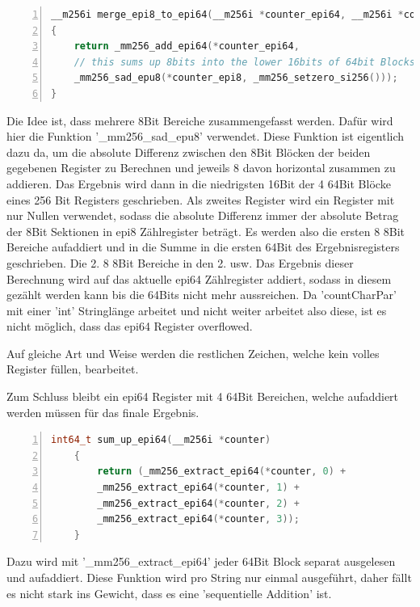\documentclass[plainarticle,zihtitle,german,final,hyperref,utf8]{zihpub}
\begin{document}
\begin{lstlisting}[language=c, numbers=left]
__m256i merge_epi8_to_epi64(__m256i *counter_epi64, __m256i *counter_epi8)
{
	return _mm256_add_epi64(*counter_epi64, 
	// this sums up 8bits into the lower 16bits of 64bit Blocks
	_mm256_sad_epu8(*counter_epi8, _mm256_setzero_si256()));
}
\end{lstlisting}

Die Idee ist, dass mehrere 8Bit Bereiche zusammengefasst werden. Dafür wird hier die Funktion '\_mm256\_sad\_epu8' verwendet. Diese Funktion ist eigentlich dazu da, um die absolute Differenz zwischen den 8Bit Blöcken der beiden gegebenen Register zu Berechnen und jeweils 8 davon horizontal zusammen zu addieren. Das Ergebnis wird dann in die niedrigsten 16Bit der 4 64Bit Blöcke eines 256 Bit Registers geschrieben. Als zweites Register wird ein Register mit nur Nullen verwendet, sodass die absolute Differenz immer der absolute Betrag der 8Bit Sektionen in epi8 Zählregister beträgt.
Es werden also die ersten 8 8Bit Bereiche aufaddiert und in die Summe in die ersten 64Bit des Ergebnisregisters geschrieben. Die 2. 8 8Bit Bereiche in den 2. usw.
Das Ergebnis dieser Berechnung wird auf das aktuelle epi64 Zählregister addiert, sodass in diesem gezählt werden kann bis die 64Bits nicht mehr aussreichen. Da 'countCharPar' mit einer 'int' Stringlänge arbeitet und nicht weiter arbeitet also diese, ist es nicht möglich, dass das epi64 Register overflowed.

Auf gleiche Art und Weise werden die restlichen Zeichen, welche kein volles Register füllen, bearbeitet.

Zum Schluss bleibt ein epi64 Register mit 4 64Bit Bereichen, welche aufaddiert werden müssen für das finale Ergebnis.
\begin{lstlisting}[language=c, numbers=left]
	int64_t sum_up_epi64(__m256i *counter)
	{
		return (_mm256_extract_epi64(*counter, 0) +
		_mm256_extract_epi64(*counter, 1) +
		_mm256_extract_epi64(*counter, 2) +
		_mm256_extract_epi64(*counter, 3));
	}
\end{lstlisting}
Dazu wird mit '\_mm256\_extract\_epi64' jeder 64Bit Block separat ausgelesen und aufaddiert. Diese Funktion wird pro String nur einmal ausgeführt, daher fällt es nicht stark ins Gewicht, dass es eine 'sequentielle Addition' ist.
\end{document}
